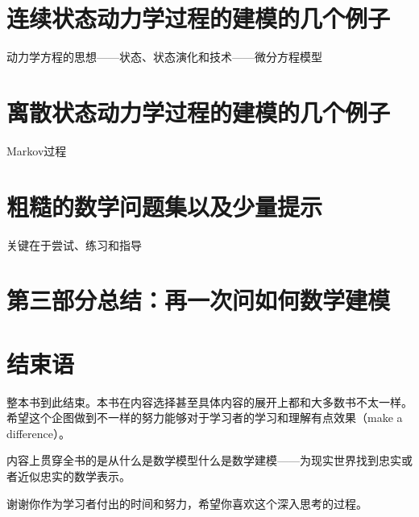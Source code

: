 \documentclass{ctexbook}
\newcommand{\ChapLabel}[1]{\label{#1}}
\begin{document}
\chapter{连续状态动力学过程的建模的几个例子}
\ChapLabel{Chap:DE}
动力学方程的思想——状态、状态演化和技术——微分方程模型

\chapter{离散状态动力学过程的建模的几个例子}
\ChapLabel{Chap:Markov}
Markov过程

\chapter{粗糙的数学问题集以及少量提示}
\ChapLabel{Chap:Questions}
关键在于尝试、练习和指导

\chapter{第三部分总结：再一次问如何数学建模}
\ChapLabel{Chap:Part3}

\chapter*{结束语}
整本书到此结束。本书在内容选择甚至具体内容的展开上都和大多数书不太一样。希望这个企图做到不一样的努力能够对于学习者的学习和理解有点效果（make a difference）。 

内容上贯穿全书的是从什么是数学模型什么是数学建模——为现实世界找到忠实或者近似忠实的数学表示。

谢谢你作为学习者付出的时间和努力，希望你喜欢这个深入思考的过程。



\printglossary[type=term]
\printglossary[type=name]
\listoffigures
\renewcommand{\listtheoremname}{举例}
\listoftheorems[ignoreall,show={Example}]

 
\end{document}
